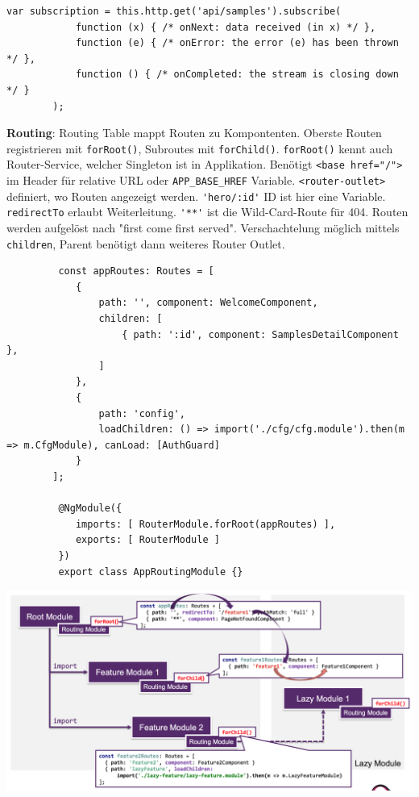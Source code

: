 \documentclass[10pt,landscape]{article}
\begin{document}
\begin{multicols}{2}
        \begin{lstlisting}[belowskip=-0.8 \baselineskip]
        var subscription = this.http.get('api/samples').subscribe(
            function (x) { /* onNext: data received (in x) */ },
            function (e) { /* onError: the error (e) has been thrown */ },
            function () { /* onCompleted: the stream is closing down */ }
        );
        \end{lstlisting}

        \textbf{Routing}: Routing Table mappt Routen zu Kompontenten.
        Oberste Routen registrieren mit \lstinline{forRoot()}, Subroutes mit \lstinline{forChild()}.
        \lstinline{forRoot()} kennt auch Router-Service, welcher Singleton ist in Applikation.
        Benötigt \lstinline{<base href="/">} im Header für relative URL oder \lstinline{APP_BASE_HREF} Variable.
        \lstinline{<router-outlet>} definiert, wo Routen angezeigt werden.
        \lstinline{'hero/:id'} ID ist hier eine Variable.
        \lstinline{redirectTo} erlaubt Weiterleitung.
        \lstinline{'**'} ist die Wild-Card-Route für 404.
        Routen werden aufgelöst nach "first come first served".
        Verschachtelung möglich mittels \lstinline{children}, Parent benötigt dann weiteres Router Outlet.

        \begin{lstlisting}
         const appRoutes: Routes = [
            {
                path: '', component: WelcomeComponent,
                children: [
                    { path: ':id', component: SamplesDetailComponent },
                ]
            },
            {
                path: 'config',
                loadChildren: () => import('./cfg/cfg.module').then(m => m.CfgModule), canLoad: [AuthGuard]
            }
        ];

         @NgModule({
            imports: [ RouterModule.forRoot(appRoutes) ],
            exports: [ RouterModule ]
         })
         export class AppRoutingModule {}
         \end{lstlisting}

        \includegraphics[width=\linewidth]{angular_routing}


\end{multicols}
\end{document}
